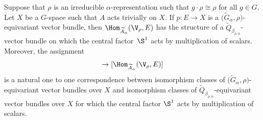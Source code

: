 \begin{Th}\label{teo,bij}
Suppose that $\rho$ is an irreducible $\alpha$-representation such that $g\cdot\rho\cong\rho$
for all $g \in G$. Let $X$ be a $G$-space such that $A$ acts trivially on $X$.
If $p\colon E\rightarrow X$ is a $\big(\widetilde{G}_{\alpha}, \rho\big)$-equivariant vector bundle, then
$\Hom_{\widetilde{A}_{\alpha}}(\V_{\rho},E)$ has the
structure of a $\widetilde{Q}_{\beta_{\rho,\alpha}}$-vector bundle on which
the central factor~$\S^{1}$ acts by multiplication of
scalars. Moreover, the assignment
\begin{gather*}
[E]\rightarrow
[\Hom_{\widetilde{A}_{\alpha}}(\V_{\rho},E)]
\end{gather*}
is a natural one to one correspondence between isomorphism
classes of $\big(\widetilde{G}_{\alpha},\rho\big)$-equivariant
vector bundles over $X$ and isomorphism classes of
$\widetilde{Q}_{\beta_{\rho,\alpha}}$-equivariant vector bundles over $X$
for which the central factor $\S^{1}$ acts by multiplication of scalars.
\end{Th}
